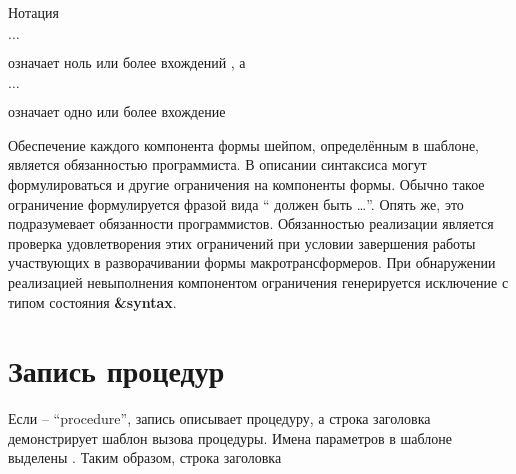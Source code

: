 Нотация
\begin{tabbing}
\qquad {} $\ldots$
\end{tabbing}
означает ноль или более вхождений , а
\begin{tabbing}
\qquad {}  $\ldots$
\end{tabbing}
означает одно или более вхождение \vspace{2mm}

Обеспечение каждого компонента формы шейпом, определённым в шаблоне, является обязанностью
программиста. В описании синтаксиса могут формулироваться и другие ограничения на компоненты формы.
Обычно такое ограничение формулируется фразой вида `` должен быть
\ldots''. Опять же, это подразумевает обязанности программистов. Обязанностью реализации является
проверка удовлетворения этих ограничений при условии завершения работы участвующих в
разворачивании формы макротрансформеров. При обнаружении реализацией невыполнения компонентом
ограничения генерируется исключение с типом состояния {\bfseries\cf\&syntax}.\vspace{2mm}


\section{Запись процедур}

Если  -- ``procedure'', запись описывает процедуру, а строка заголовка
демонстрирует шаблон вызова процедуры. Имена параметров в шаблоне выделены .
Таким образом, строка заголовка\vspace{1mm}

